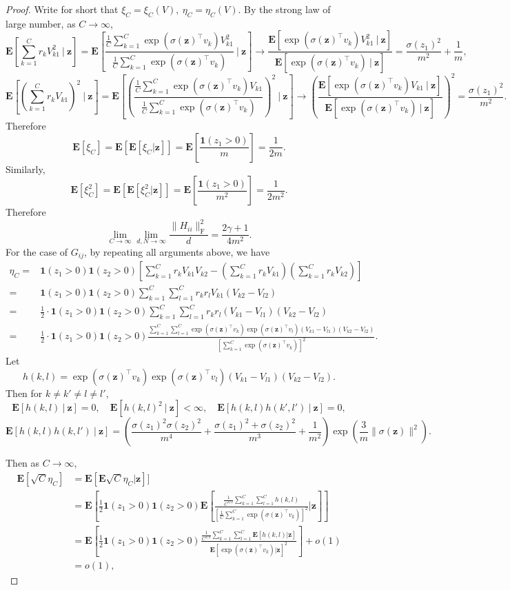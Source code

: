 \documentclass[10pt,a4paper]{amsart}
\newcommand\mf{\mathbf}
\newcommand{\E}{\mathbf{E}}
\newcommand{\bea}{\begin{equation}\begin{aligned}}
\newcommand{\eea}{\end{aligned}\end{equation}}
\newcommand{\rw}{\rightarrow}
\renewcommand{\l}{\left}
\renewcommand{\r}{\right}
\begin{document}
\begin{proof}
Write for short that $\xi_C=\xi_C(V),\ \eta_C=\eta_C(V)$. By the strong law of large number, as $C\rw \infty$,
$$
\E\l[\sum_{k=1}^C r_kV_{k1}^2\ \bigg|\ \mf{z}\r]=\E\l[\frac{\frac{1}{C}\sum_{k=1}^C\exp({\sigma(\mf{z})^\top v_k})V_{k1}^2}{\frac{1}{C}\sum_{k=1}^C\exp({\sigma(\mf{z})^\top v_k})}\ \bigg|\ \mf{z}\r]\rw \frac{\E[\exp({\sigma(\mf{z})^\top v_k})V_{k1}^2\ |\ \mf{z}]}{\E[\exp({\sigma(\mf{z})^\top v_k})\ |\ \mf{z}]}=\frac{\sigma(z_1)^2}{m^2}+\frac{1}{m},
$$
$$
\E\l[\l(\sum_{k=1}^C r_kV_{k1}\r)^2\ \bigg|\ \mf{z}\r]=\E\l[\l(\frac{\frac{1}{C}\sum_{k=1}^C\exp({\sigma(\mf{z})^\top v_k})V_{k1}}{\frac{1}{C}\sum_{k=1}^C\exp({\sigma(\mf{z})^\top v_k})}\r)^2\ \bigg|\ \mf{z}\r]\rw \l(\frac{\E[\exp({\sigma(\mf{z})^\top v_k})V_{k1}\ |\ \mf{z}]}{\E[\exp({\sigma(\mf{z})^\top v_k})\ |\ \mf{z}]}\r)^2=\frac{\sigma(z_1)^2}{m^2}.
$$
Therefore 
$$
\E[\xi_C]=\E[\E[\xi_C|\mf{z}]]=\E\l[\frac{\mf{1}(z_1>0)}{m}\r]=\frac{1}{2m}.
$$
Similarly,
$$
\E[\xi_C^2]=\E[\E[\xi_C^2|\mf{z}]]=\E\l[\frac{\mf{1}(z_1>0)}{m^2}\r]=\frac{1}{2m^2}.
$$
Therefore 
$$
\lim_{C\rw\infty}\lim_{d,N\rw\infty}\frac{\|H_{ii}\|_{\operatorname{F}}^2}{d}=\frac{2\gamma+1}{4m^2}.
$$
For the case of $G_{ij}$, by repeating all arguments above, we have
\bea
\eta_C=&\mf{1}(z_1>0)\mf{1}(z_2>0)\l[\sum_{k=1}^C r_kV_{k1}V_{k2}-\l(\sum_{k=1}^C r_k V_{k1}\r)\l(\sum_{k=1}^C r_k V_{k2}\r)\r]\\
=&\mf{1}(z_1>0)\mf{1}(z_2>0)\sum_{k=1}^C\sum_{l=1}^C r_k r_l V_{k1}(V_{k2}-V_{l2})\\
=&\frac{1}{2}\cdot\mf{1}(z_1>0)\mf{1}(z_2>0)\sum_{k=1}^C\sum_{l=1}^C r_k r_l (V_{k1}-V_{l1})(V_{k2}-V_{l2})\\
=&\frac{1}{2}\cdot\mf{1}(z_1>0)\mf{1}(z_2>0) \frac{\sum_{k=1}^C\sum_{l=1}^C \exp(\sigma(\mf{z})^\top v_k)\exp(\sigma(\mf{z})^\top v_l) (V_{k1}-V_{l1})(V_{k2}-V_{l2})}{\l[\sum_{k=1}^C \exp(\sigma(\mf{z})^\top v_k)\r]^2}.
\eea
Let 
$$
h(k,l)=\exp(\sigma(\mf{z})^\top v_k)\exp(\sigma(\mf{z})^\top v_l) (V_{k1}-V_{l1})(V_{k2}-V_{l2}).
$$
Then for $k\ne k'\ne l\ne l'$,
$$
\E[h(k,l)\ |\ \mf{z}]=0,\quad \E[h(k,l)^2\ |\ \mf{z}]<\infty,\quad
\E[h(k,l)h(k',l')\ |\ \mf{z}]=0,
$$
$$
\E[h(k,l)h(k,l')\ |\ \mf{z}]= \l(\frac{\sigma(z_1)^2\sigma(z_2)^2}{m^4}+\frac{\sigma(z_1)^2+\sigma(z_2)^2}{m^3}+\frac{1}{m^2}\r)\exp\l(\frac{3}{m}\|\sigma(\mf{z})\|^2\r).
$$

Then as $C\rw\infty$,
\bea
\E[\sqrt{C}\eta_C]&=\E[\E\sqrt{C}\eta_C|\mf{z}]]\\
&=\E\l[\frac{1}{2}\mf{1}(z_1>0)\mf{1}(z_2>0)\E\l[\frac{\frac{1}{C^{3/2}}\sum_{k=1}^C\sum_{l=1}^C h(k,l)}{\l[\frac{1}{C}\sum_{k=1}^C \exp(\sigma(\mf{z})^\top v_k)\r]^2}\bigg|\mf{z}\r]\r]\\
&=\E\l[\frac{1}{2}\mf{1}(z_1>0)\mf{1}(z_2>0)\frac{\frac{1}{C^{3/2}}\sum_{k=1}^C\sum_{l=1}^C\E\l[ h(k,l)\bigg|\mf{z}\r]}{\E\l[ \exp(\sigma(\mf{z})^\top v_k)\bigg|\mf{z}\r]^2}\r]+o(1)\\
&=o(1),
\eea


\end{proof}
\end{document}
